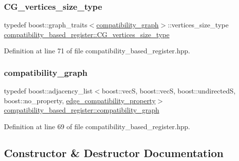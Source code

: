 \subsubsection{\texorpdfstring{C\+G\+\_\+vertices\+\_\+size\+\_\+type}{CG\_vertices\_size\_type}}
{\footnotesize\ttfamily typedef boost\+::graph\+\_\+traits$<$\hyperlink{classcompatibility__based__register_a8d196f6310dd913b6b53ffbbbd7e76d8}{compatibility\+\_\+graph}$>$\+::vertices\+\_\+size\+\_\+type \hyperlink{classcompatibility__based__register_a67a4eaed3a0abaefa5bced1d77e58190}{compatibility\+\_\+based\+\_\+register\+::\+C\+G\+\_\+vertices\+\_\+size\+\_\+type}\hspace{0.3cm}{\ttfamily [protected]}}



Definition at line 71 of file compatibility\+\_\+based\+\_\+register.\+hpp.

\mbox{\label{classcompatibility__based__register_a8d196f6310dd913b6b53ffbbbd7e76d8}} 
\subsubsection{\texorpdfstring{compatibility\+\_\+graph}{compatibility\_graph}}
{\footnotesize\ttfamily typedef boost\+::adjacency\+\_\+list$<$boost\+::vecS, boost\+::vecS, boost\+::undirectedS, boost\+::no\+\_\+property, \hyperlink{structcompatibility__based__register_1_1edge__compatibility__property}{edge\+\_\+compatibility\+\_\+property}$>$ \hyperlink{classcompatibility__based__register_a8d196f6310dd913b6b53ffbbbd7e76d8}{compatibility\+\_\+based\+\_\+register\+::compatibility\+\_\+graph}\hspace{0.3cm}{\ttfamily [protected]}}



Definition at line 69 of file compatibility\+\_\+based\+\_\+register.\+hpp.



\subsection{Constructor \& Destructor Documentation}
\mbox{\label{classcompatibility__based__register_ae7bf29c0536a7a36c144258b953d8660}} 
